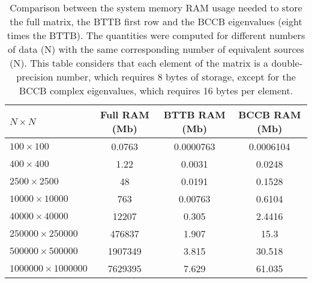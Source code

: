 \documentclass[paper]{geophysics}
\begin{document}
\begin{table}[h]
	\begin{center}
		\begin{tabular}{|l|c|c|c|}
			\hline
			\textbf{$N \times N$} & \textbf{Full RAM (Mb)} & \textbf{BTTB RAM (Mb)}  & \textbf{BCCB RAM (Mb)}\\
			\hline 
			$100 \times 100$ & 0.0763 & 0.0000763 & 0.0006104\\
			\hline
			$400 \times 400$ & 1.22 & 0.0031 & 0.0248\\
			\hline
			$2500 \times 2500$ & 48 & 0.0191 & 0.1528\\
			\hline
			$10000 \times 10000$ & 763 & 0.00763 & 0.6104\\
			\hline
			$40000 \times 40000$ & 12207 & 0.305 & 2.4416 \\
			\hline
			$250000 \times 250000$ & 476837 & 1.907 & 15.3 \\
			\hline
			$500000 \times 500000$ & 1907349 & 3.815 & 30.518 \\
			\hline
			$1000000 \times 1000000$ & 7629395 & 7.629 & 61.035 \\
			\hline
		\end{tabular}
		\caption{Comparison between the system memory RAM usage needed to store the full matrix, the BTTB first row and the BCCB eigenvalues (eight times the BTTB). The quantities were computed for different numbers of data (N) with the same corresponding number of equivalent sources (N). This table considers that each element of the matrix is a double-precision number, which requires 8 bytes of storage, except for the BCCB complex eigenvalues, which requires 16 bytes per element.}
	\end{center}
\end{table} 
\end{document}
